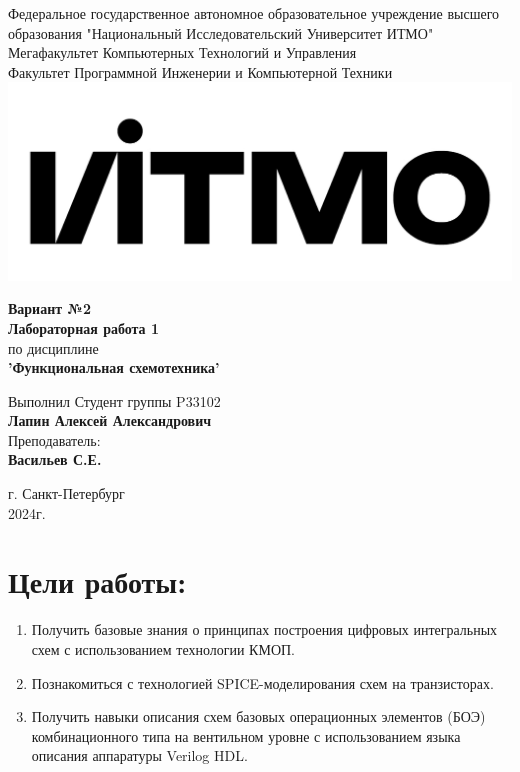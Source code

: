 \documentclass[12pt,onecolumn]{article}
\begin{document}
\setcounter{tocdepth}{4}
\begin{center}
    Федеральное государственное автономное образовательное учреждение высшего образования "Национальный Исследовательский Университет ИТМО"\\ 
    Мегафакультет Компьютерных Технологий и Управления\\
    Факультет Программной Инженерии и Компьютерной Техники \\
    \includegraphics[scale=0.3]{image/itmo.jpg} %
\end{center}
\vspace{1cm}


\begin{center}
    \large \textbf{Вариант №2}\\
    \textbf{Лабораторная работа 1}\\
    по дисциплине\\
    \textbf{'Функциональная схемотехника'}
\end{center}

\vspace{2cm}

\begin{flushright}
  Выполнил Студент  группы P33102\\
  \textbf{Лапин Алексей Александрович}\\
  Преподаватель: \\
  \textbf{Васильев С.Е.}\\
\end{flushright}

\vspace{9cm}
\begin{center}
    г. Санкт-Петербург\\
    2024г.
\end{center}
\pagestyle{empty}

\newpage
\tableofcontents
\newpage
\pagestyle{plain}
\section{Цели работы:}
\begin{enumerate}
    \item Получить базовые знания о принципах построения цифровых интегральных схем с использованием технологии КМОП.
    \item Познакомиться с технологией SPICE-моделирования схем на транзисторах.
    \item Получить навыки описания схем базовых операционных элементов (БОЭ) комбинационного типа на вентильном уровне с использованием языка описания аппаратуры Verilog HDL.
\end{enumerate}
\end{document}
